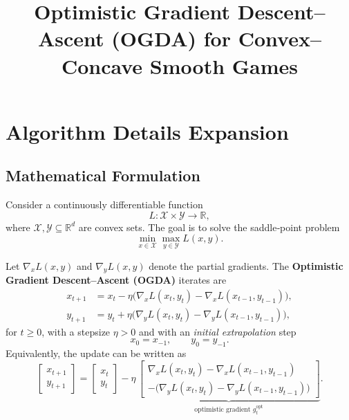 \documentclass{article}
\title{Optimistic Gradient Descent–Ascent (OGDA) for Convex–Concave Smooth Games}
\author{}
\date{}
\newcommand{\R}{\mathbb{R}}
\begin{document}
\maketitle

\section*{Algorithm Details Expansion}

\subsection*{Mathematical Formulation}
Consider a continuously differentiable function 
\[
L:\mathcal{X}\times\mathcal{Y}\rightarrow\R,
\]
where $\mathcal{X},\mathcal{Y}\subseteq\R^{d}$ are convex sets.  
The goal is to solve the saddle‑point problem
\[
\min_{x\in\mathcal{X}}\max_{y\in\mathcal{Y}}L(x,y).
\]

Let $\nabla_x L(x,y)$ and $\nabla_y L(x,y)$ denote the partial gradients.
The \textbf{Optimistic Gradient Descent–Ascent (OGDA)} iterates are
\begin{align}
x_{t+1}&=x_t-\eta\bigl(\nabla_x L(x_t,y_t)-\nabla_x L(x_{t-1},y_{t-1})\bigr),\label{eq:ogda-x}\\
y_{t+1}&=y_t+\eta\bigl(\nabla_y L(x_t,y_t)-\nabla_y L(x_{t-1},y_{t-1})\bigr),\label{eq:ogda-y}
\end{align}
for $t\ge 0$, with a stepsize $\eta>0$ and with an \emph{initial extrapolation} step
\[
x_{0}=x_{-1},\qquad y_{0}=y_{-1}.
\]
Equivalently, the update can be written as
\[
\begin{bmatrix}x_{t+1}\\ y_{t+1}\end{bmatrix}
=
\begin{bmatrix}x_{t}\\ y_{t}\end{bmatrix}
-\eta\,
\underbrace{\begin{bmatrix}
\nabla_x L(x_t,y_t)-\nabla_x L(x_{t-1},y_{t-1})\\[2mm]
-\bigl(\nabla_y L(x_t,y_t)-\nabla_y L(x_{t-1},y_{t-1})\bigr)
\end{bmatrix}}_{\displaystyle \text{optimistic gradient }g_t^{\text{opt}}}.
\]
\end{document}
